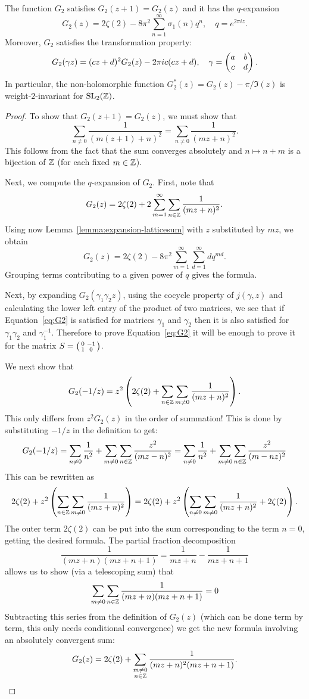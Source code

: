 \begin{theorem}
The function  $G_2$ satisfies $G_2(z+1)=G_2(z)$ and  it has the $q$-expansion
\[
G_2(z) = 2\zeta(2) - 8\pi^2\sum_{n=1}^\infty \sigma_1(n)q^n,\quad q=e^{2\pi i z}.
\]
Moreover, $G_2$ satisfies the transformation property:
\begin{equation}
\label{eq:G2}
G_2(\gamma z) = (cz+d)^2G_2(z)- 2\pi i c(cz+d),\quad \gamma=\left(\begin{matrix}a&b\\c&d\end{matrix}\right).
\end{equation}
In particular, the non-holomorphic function  $G_2^*(z) = G_2(z)-\pi/\Im(z)$ is weight-$2$-invariant for $\operatorname{SL}_2(\mathbb{Z})$.
\end{theorem}
\begin{proof}

To show that $G_2(z+1)=G_2(z)$, we must show that
\[
\sum_{n\neq 0}\frac{1}{(m(z+1)+n)^2} = \sum_{n\neq 0} \frac{1}{(mz+n)^2}.
\]
This follows from the fact that the sum converges absolutely and $n\mapsto n+m$ is a bijection of $\mathbb{Z}$ (for each fixed $m\in\mathbb{Z}$).

Next, we compute the $q$-expansion of $G_2$. First, note that
\[
G_2(z)=2\zeta(2)+2\sum_{m=1}^\infty \sum_{n\in\mathbb{Z}}\frac{1}{(mz+n)^2}.
\]
Using now Lemma~\ref{lemma:expansion-latticesum} with $z$ substituted by $mz$, we obtain
\[
G_2(z)=2\zeta(2)-8\pi^2\sum_{m=1}^\infty\sum_{d=1}^\infty dq^{md}.
\]
Grouping terms contributing to a given power of $q$ gives the formula.

Next, by expanding $G_2(\gamma_1\gamma_2z)$, using the cocycle property of $j(\gamma,z)$ and calculating the lower left entry of the product of two matrices, we see that if Equation~\ref{eq:G2} is satisfied for matrices $\gamma_1$ and $\gamma_2$ then it is also satisfied for $\gamma_1\gamma_2$ and $\gamma_1^{-1}$. Therefore to prove Equation~\ref{eq:G2} it will be enough to prove it for the matrix $S=\left(\begin{smallmatrix}0&-1\\1&0\end{smallmatrix}\right)$.

We next show that
\[
G_2(-1/z) = z^2 \left(2\zeta(2) + \sum_{n\in\mathbb{Z}}\sum_{m\neq 0}\frac{1}{(mz+n)^2}\right).
\]
This only differs from $z^2G_2(z)$ in the order of summation! This is done by substituting $-1/z$ in the definition to get:
\[
G_2(-1/z) = \sum_{n\neq 0} \frac 1{n^2} + \sum_{m\neq 0}\sum_{n\in\mathbb{Z}}\frac{z^2}{(mz-n)^2} = \sum_{n\neq 0} \frac 1{n^2} + \sum_{m\neq 0}\sum_{n\in\mathbb{Z}}\frac{z^2}{(m-nz)^2}
\]
This can be rewritten as
\[
2\zeta(2) + z^2\left(\sum_{n\in\mathbb{Z}}\sum_{m\neq 0}\frac{1}{(mz+n)^2}\right)=2\zeta(2)+z^2\left(\sum_{n\neq 0}\sum_{m\neq 0} \frac{1}{(mz+n)^2} + 2\zeta(2)\right).
\]
The outer term $2\zeta(2)$ can be put into the sum corresponding to the term $n=0$, getting the desired formula. The partial fraction decomposition
\[
\frac{1}{(mz+n)(mz+n+1)} = \frac{1}{mz+n}-\frac{1}{mz+n+1}
\]
allows us to show (via a telescoping sum) that
\[
\sum_{m\neq 0} \sum_{n\in\mathbb{Z}} \frac{1}{(mz+n)(mz+n+1)} = 0
\]
Subtracting this series from the definition of $G_2(z)$ (which can be done term by term, this only needs conditional convergence) we get the new formula involving an absolutely convergent sum:
\[
G_2(z)=2\zeta(2)+\sum_{\substack{m\neq 0\\n\in\mathbb{Z}}} \frac{1}{(mz+n)^2(mz+n+1)}.
\]


\end{proof}
